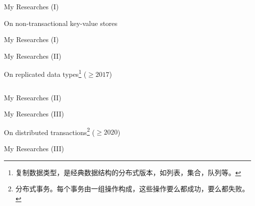 \begin{frame}{My Researches (I)}
	\begin{center}

		On non-transactional key-value stores \\[6pt]

	\end{center}
\end{frame}

\begin{frame}{My Researches (I)}

	\vspace{0.30cm}

	\vspace{0.30cm}
\end{frame}

\begin{frame}{My Researches (II)}
	\begin{center}
		On replicated data types\footnote{复制数据类型，是经典数据结构的分布式版本，如列表，集合，队列等。} ($\ge 2017$) \\[6pt]

		\begin{columns}[c]
		\end{columns}
	\end{center}
\end{frame}

\begin{frame}{My Researches (II)}

	\vspace{0.30cm}

	\vspace{0.30cm}

	\vspace{0.30cm}
\end{frame}

\begin{frame}{My Researches (III)}
	\begin{center}
		On distributed transactions\footnote{
			分布式事务。每个事务由一组操作构成，这些操作要么都成功，要么都失败。} ($\ge 2020$) \\[6pt]

	\end{center}
\end{frame}

\begin{frame}{My Researches (III)}
\end{frame}
